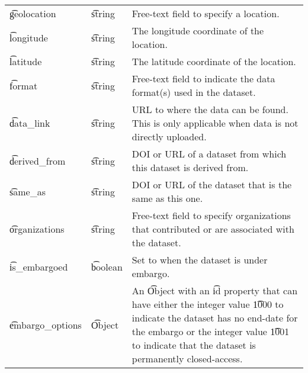 \begin{tabularx}{\textwidth}{*{2}{!{\VRule[-1pt]}l}!{\VRule[-1pt]}X}
  \t{geolocation}    & \t{string}           & Free-text field to specify a
                                              location.\\
  \t{longitude}      & \t{string}           & The longitude coordinate of the
                                              location.\\
  \t{latitude}       & \t{string}           & The latitude coordinate of the
                                              location.\\
  \t{format}         & \t{string}           & Free-text field to indicate the
                                              data format(s) used in the
                                              dataset.\\
  \t{data\_link}     & \t{string}           & URL to where the data can be
                                              found.  This is only applicable
                                              when data is not directly
                                              uploaded.\\
  \t{derived\_from}  & \t{string}           & DOI or URL of a dataset from
                                              which this dataset is derived
                                              from.\\
  \t{same\_as}       & \t{string}           & DOI or URL of the dataset that
                                              is the same as this one.\\
  \t{organizations}  & \t{string}           & Free-text field to specify
                                              organizations that contributed
                                              or are associated with the
                                              dataset.\\
  \t{is\_embargoed}  & \t{boolean}          & Set to  when the
                                              dataset is under embargo.\\
  \t{embargo\_options} & \t{Object}         & An \t{Object} with an \t{id}
                                              property that can have either
                                              the integer value \t{1000} to
                                              indicate the dataset has no
                                              end-date for the embargo or the
                                              integer value \t{1001} to indicate
                                              that the dataset is permanently
                                              closed-access.\\

\end{tabularx}
